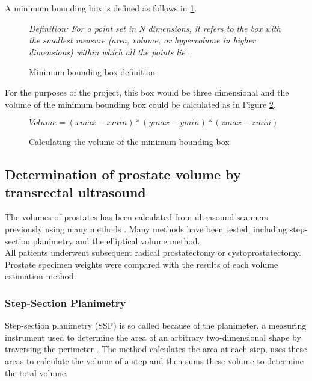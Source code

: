 A minimum bounding box is defined as follows in \ref{fig:bounding_box_definition}.\\

\begin{figure}[h]
\textit{Definition: For a point set in N dimensions, it refers to the box with the smallest measure (area, volume, or hypervolume in higher dimensions) within which all the points lie} \cite{Barequet2001}.
\caption {Minimum bounding box definition}
\label{fig:bounding_box_definition}
\end{figure}

For the purposes of the project, this box would be three dimensional and the volume of the minimum bounding box could be calculated as in Figure \ref{fig:calculating_the_volume_of_the_minimum_bounding_box}.\\

\begin{figure}[h]
\begin{center}
$Volume = (xmax -xmin) * (ymax - ymin) * (zmax - zmin)$
\end{center}
\caption{Calculating the volume of the minimum bounding box}
\label{fig:calculating_the_volume_of_the_minimum_bounding_box}
\end{figure}

\subsection{Determination of prostate volume by transrectal ultrasound}

The volumes of prostates has been calculated from ultrasound scanners previously using many methods \cite{K1991}. 
Many methods have been tested, including step-section planimetry and the elliptical volume method.\\ 

All patients underwent subsequent radical prostatectomy or cystoprostatectomy. Prostate specimen weights were compared with the results of each volume estimation method. 

\subsubsection{Step-Section Planimetry}
Step-section planimetry (SSP) is so called because of the planimeter, a measuring instrument used to determine the area of an arbitrary two-dimensional shape by traversing the perimeter \cite{Bryant2011}. 
The method calculates the area at each step, uses these areas to calculate the volume of a step and then sums these volume to determine the total volume.\\

